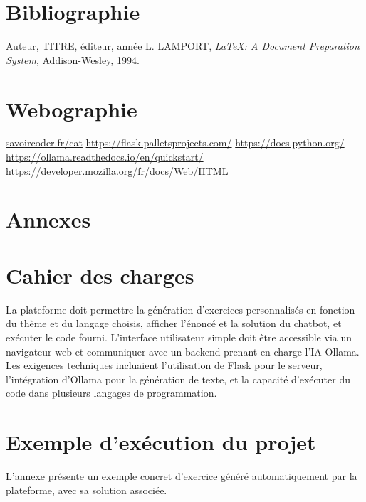 \documentclass[a4paper, 12pt, twoside]{article}
\begin{document}
\section{Bibliographie}
\renewcommand{\bibname}{}
\renewcommand{\refname}{}
\begin{thebibliography}{2}
 Auteur, TITRE, éditeur, année
 L. LAMPORT, {\it \LaTeX: A Document Preparation System}, Addison-Wesley, 1994.
\end{thebibliography}

\newpage
\section{Webographie}
\begin{thebibliography}{2}
 \url{savoircoder.fr/cat}
 \url{https://flask.palletsprojects.com/}
 \url{https://docs.python.org/}
 \url{https://ollama.readthedocs.io/en/quickstart/}
 \url{https://developer.mozilla.org/fr/docs/Web/HTML}
\end{thebibliography}

\newpage
\section{Annexes}
\appendix
\makeatletter
\def\@seccntformat#1{Annexe~\csname the#1\endcsname:\quad}
\makeatother

	\section{Cahier des charges}
La plateforme doit permettre la génération d'exercices personnalisés en fonction du thème et du langage choisis, afficher l'énoncé et la solution du chatbot, et exécuter le code fourni. L'interface utilisateur simple doit être accessible via un navigateur web et communiquer avec un backend prenant en charge l'IA Ollama. Les exigences techniques incluaient l'utilisation de Flask pour le serveur, l'intégration d'Ollama pour la génération de texte, et la capacité d'exécuter du code dans plusieurs langages de programmation.

	\section{Exemple d'exécution du projet}
L'annexe présente un exemple concret d'exercice généré automatiquement par la plateforme, avec sa solution associée. 
\end{document}
